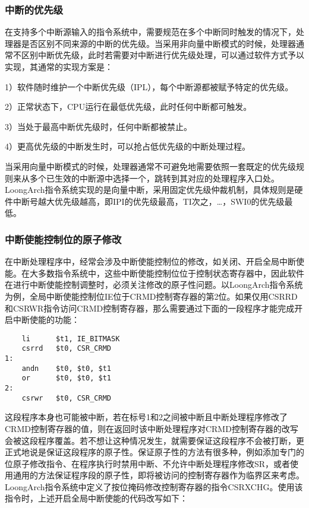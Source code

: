\documentclass[]{ctexbook}
\begin{document}
\hypertarget{ux4e2dux65adux7684ux4f18ux5148ux7ea7}{%
\subsubsection{中断的优先级}\label{ux4e2dux65adux7684ux4f18ux5148ux7ea7}}

在支持多个中断源输入的指令系统中，需要规范在多个中断同时触发的情况下，处理器是否区别不同来源的中断的优先级。当采用非向量中断模式的时候，处理器通常不区别中断优先级，此时若需要对中断进行优先级处理，可以通过软件方式予以实现，其通常的实现方案是：

1）软件随时维护一个中断优先级（IPL），每个中断源都被赋予特定的优先级。

2）正常状态下，CPU运行在最低优先级，此时任何中断都可触发。

3）当处于最高中断优先级时，任何中断都被禁止。

4）更高优先级的中断发生时，可以抢占低优先级的中断处理过程。

当采用向量中断模式的时候，处理器通常不可避免地需要依照一套既定的优先级规则来从多个已生效的中断源中选择一个，跳转到其对应的处理程序入口处。LoongArch指令系统实现的是向量中断，采用固定优先级仲裁机制，具体规则是硬件中断号越大优先级越高，即IPI的优先级最高，TI次之，\ldots，SWI0的优先级最低。

\hypertarget{ux4e2dux65adux4f7fux80fdux63a7ux5236ux4f4dux7684ux539fux5b50ux4feeux6539}{%
\subsubsection{中断使能控制位的原子修改}\label{ux4e2dux65adux4f7fux80fdux63a7ux5236ux4f4dux7684ux539fux5b50ux4feeux6539}}

在中断处理程序中，经常会涉及中断使能控制位的修改，如关闭、开启全局中断使能。在大多数指令系统中，这些中断使能控制位位于控制状态寄存器中，因此软件在进行中断使能控制调整时，必须关注修改的原子性问题。以LoongArch指令系统为例，全局中断使能控制位IE位于CRMD控制寄存器的第2位。如果仅用CSRRD和CSRWR指令访问CRMD控制寄存器，那么需要通过下面的一段程序才能完成开启中断使能的功能：

\begin{verbatim}
    li      $t1, IE_BITMASK
    csrrd   $t0, CSR_CRMD
1:
    andn    $t0, $t0, $t1
    or      $t0, $t0, $t1
2:
    csrwr   $t0, CSR_CRMD
\end{verbatim}

这段程序本身也可能被中断，若在标号1和2之间被中断且中断处理程序修改了CRMD控制寄存器的值，则在返回时该中断处理程序对CRMD控制寄存器的改写会被这段程序覆盖。若不想让这种情况发生，就需要保证这段程序不会被打断，更正式地说是保证这段程序的原子性。保证原子性的方法有很多种，例如添加专门的位原子修改指令、在程序执行时禁用中断、不允许中断处理程序修改SR，或者使用通用的方法保证程序段的原子性，即将被访问的控制寄存器作为临界区来考虑。LoongArch指令系统中定义了按位掩码修改控制寄存器的指令CSRXCHG。使用该指令时，上述开启全局中断使能的代码改写如下：
\end{document}
